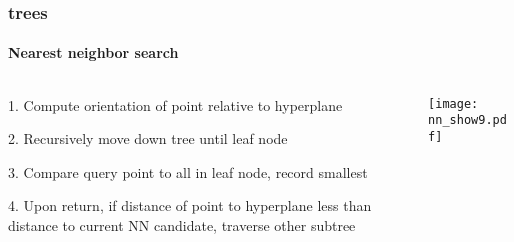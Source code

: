\begin{frame}[noframenumbering]
  \frametitle{\kd trees}
  \framesubtitle{Nearest neighbor search}
  \begin{columns}[T]
    \begin{column}{.5\textwidth}
      \begin{block}{}%
        {\color{white} 1.\hspace{1mm} Compute orientation of point relative to hyperplane
          \\\vspace{0.4cm}
        
        2.\hspace{1mm} Recursively move down tree until leaf node\\\vspace{0.4cm}

        {\color{graph-red}
        3.\hspace{1mm} Compare query point to all in leaf node, record smallest}\\\vspace{0.4cm}
    
        4.\hspace{1mm} Upon return, if distance of point to hyperplane less than distance to current
          NN candidate, traverse other subtree}
      \end{block}
    \end{column}
    \begin{column}{.5\textwidth}
      \begin{block}{}
        \texttt{[image: nn\_show9.pdf]}
      \end{block}
    \end{column}
  \end{columns}
\end{frame}
